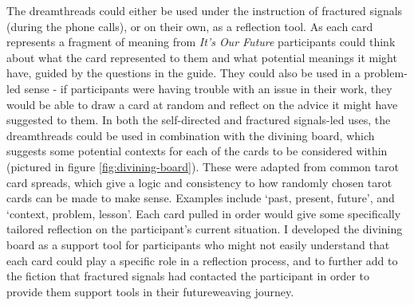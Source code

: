 The dreamthreads could either be used under the instruction of fractured signals (during the phone calls), or on their own, as a reflection tool. As each card represents a fragment of meaning from \textit{It’s Our Future} participants could think about what the card represented to them and what potential meanings it might have, guided by the questions in the guide. They could also be used in a problem-led sense - if participants were having trouble with an issue in their work, they would be able to draw a card at random and reflect on the advice it might have suggested to them. In both the self-directed and fractured signals-led uses, the dreamthreads could be used in combination with the divining board, which suggests some potential contexts for each of the cards to be considered within (pictured in figure \ref{fig:divining-board}). These were adapted from common tarot card spreads, which give a logic and consistency to how randomly chosen tarot cards can be made to make sense. Examples include ‘past, present, future’, and ‘context, problem, lesson’. Each card pulled in order would give some specifically tailored reflection on the participant's current situation. I developed the divining board as a support tool for participants who might not easily understand that each card could play a specific role in a reflection process, and to further add to the fiction that fractured signals had contacted the participant in order to provide them support tools in their futureweaving journey.
